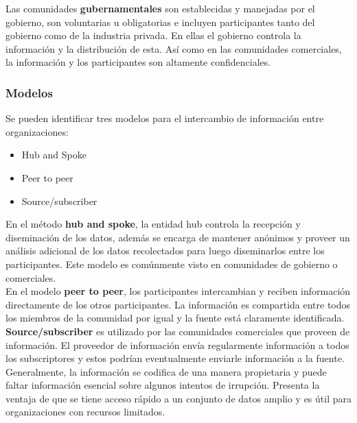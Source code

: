 Las comunidades \textbf{gubernamentales} son establecidas y manejadas por el gobierno, 
son voluntarias u obligatorias e incluyen participantes tanto del gobierno como 
de la industria privada. En ellas el gobierno controla la información y la 
distribución de esta. Así como en las comunidades comerciales, la información y 
los participantes son altamente confidenciales.\\

\subsubsection{Modelos}

Se pueden identificar tres modelos para el intercambio de información entre 
organizaciones:
\begin{itemize}
  \item Hub and Spoke
  \item Peer to peer
  \item Source/subscriber
\end{itemize}

En el método \textbf{hub and spoke}, la entidad hub controla la recepción y diseminación 
de los datos, además se encarga de mantener anónimos y proveer un análisis 
adicional de los datos recolectados para luego diseminarlos entre los 
participantes. Este modelo es comúnmente visto en comunidades de gobierno o comerciales.\\

En el modelo \textbf{peer to peer}, los participantes intercambian y reciben información 
directamente de los otros participantes. La información es compartida entre 
todos los miembros de la comunidad por igual y la fuente está claramente 
identificada.\\

\textbf{Source/subscriber} es utilizado por las 
comunidades comerciales que proveen de información. El proveedor de información 
envía regularmente información a todos los subscriptores y estos podrían 
eventualmente enviarle información a la fuente. Generalmente, la información se 
codifica de una manera propietaria y puede faltar información esencial sobre 
algunos intentos de irrupción. Presenta la ventaja de que se tiene acceso rápido 
a un conjunto de datos amplio y es útil para organizaciones con recursos 
limitados.\\